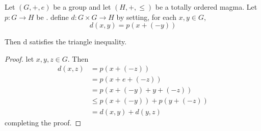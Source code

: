 \begin{prop}
    \label{prop:subadditiveinducestriangleinequality}
    Let $(G,+, e)$ be a group and let $(H,+,\leq)$ be a totally ordered magma. 
    Let $p:G \to H$ be \Subadditive. 
    define $d:G \times G \to H$ by setting, for each $x,y \in G$, 
    \begin{equation}
        d(x,y) =  p(x+(-y))
    \end{equation}

    Then d satisfies the triangle inequality. 

    \begin{proof}
    let $x,y, z \in G$. Then
    \begin{align*}
        d(x,z) &= p(x+(-z))\\
        & = p(x+e+(-z))\\
        & = p(x+(-y)+y+(-z))\\
        & \leq p(x+(-y))+p(y+(-z))\\
        & = d(x,y)+d(y,z)
    \end{align*}
    completing the proof. 
    \end{proof} 
\end{prop}
